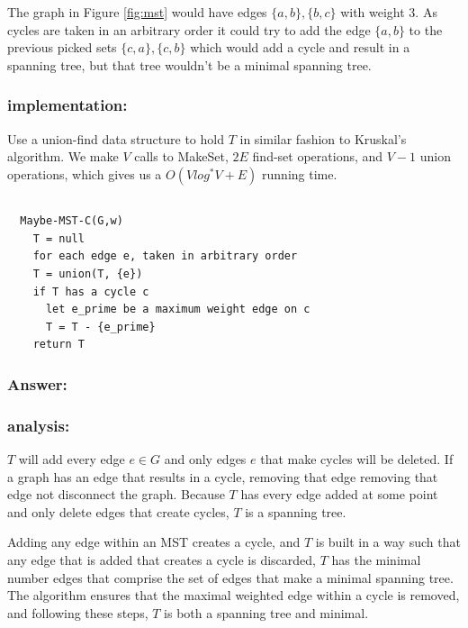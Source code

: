\documentclass[titlepage]{article}
\theoremstyle{definition}
\begin{document}
    The graph in Figure \ref{fig:mst} would have edges $\{a,b\}, \{b,c\}$ with
    weight 3. As cycles are taken in an arbitrary order it could try to add the
    edge $\{a,b\}$  to the previous picked sets $\{c,a\}, \{c,b\}$ which would add
    a cycle and result in a spanning tree, but that tree wouldn't be a minimal
    spanning tree. 

    \subsubsection{implementation:}
      Use a union-find data structure to hold $T$ in similar fashion to Kruskal's
      algorithm. We make $V$ calls to MakeSet, $2E$ find-set operations, and
      $V-1$ union operations, which gives us a $O(V log^* V + E)$ running time. 


\subsection{}
  \begin{lstlisting}
  Maybe-MST-C(G,w)
    T = null
    for each edge e, taken in arbitrary order
    T = union(T, {e})
    if T has a cycle c
      let e_prime be a maximum weight edge on c
      T = T - {e_prime}
    return T
  \end{lstlisting}

  \subsubsection{Answer:}
  \subsubsection{analysis:}
    $T$ will add every edge $e \in G$ and only edges $e$ that make cycles will
    be deleted. If a graph has an edge that results in a cycle, removing that
    edge removing that edge not disconnect the graph. Because $T$ has every
    edge added at some point and only delete edges that create cycles, $T$ is a
    spanning tree. 

    Adding any  edge within an MST creates a cycle, and $T$ is built in a way
    such that any edge that is added that creates a cycle is discarded, $T$ has
    the minimal number edges that comprise the set of edges that make a minimal
    spanning tree. The algorithm ensures that the maximal weighted edge within
    a cycle is removed, and following these steps, $T$ is both a spanning tree
    and minimal. 
\end{document}
